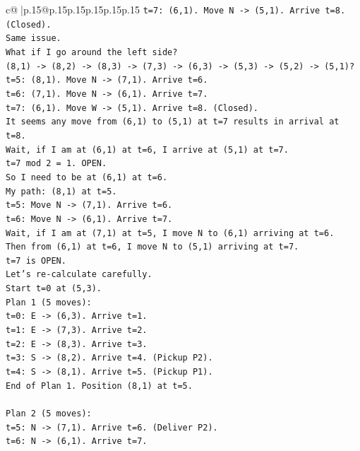 \documentclass{article}
\begin{document}
{\begin{supertabular}{c@{$\;$}|p{.15\linewidth}@{}p{.15\linewidth}p{.15\linewidth}p{.15\linewidth}p{.15\linewidth}p{.15\linewidth}}
{{{\texttt{t=7: (6,1). Move N {-}> (5,1). Arrive t=8. (Closed).} \\
\texttt{Same issue.} \\
\texttt{What if I go around the left side?} \\
\texttt{(8,1) {-}> (8,2) {-}> (8,3) {-}> (7,3) {-}> (6,3) {-}> (5,3) {-}> (5,2) {-}> (5,1)?} \\
\texttt{t=5: (8,1). Move N {-}> (7,1). Arrive t=6.} \\
\texttt{t=6: (7,1). Move N {-}> (6,1). Arrive t=7.} \\
\texttt{t=7: (6,1). Move W {-}> (5,1). Arrive t=8. (Closed).} \\
\texttt{It seems any move from (6,1) to (5,1) at t=7 results in arrival at t=8.} \\
\texttt{Wait, if I am at (6,1) at t=6, I arrive at (5,1) at t=7.} \\
\texttt{t=7 mod 2 = 1. OPEN.} \\
\texttt{So I need to be at (6,1) at t=6.} \\
\texttt{My path: (8,1) at t=5.} \\
\texttt{t=5: Move N {-}> (7,1). Arrive t=6.} \\
\texttt{t=6: Move N {-}> (6,1). Arrive t=7.} \\
\texttt{Wait, if I am at (7,1) at t=5, I move N to (6,1) arriving at t=6.} \\
\texttt{Then from (6,1) at t=6, I move N to (5,1) arriving at t=7.} \\
\texttt{t=7 is OPEN.} \\
\texttt{Let's re{-}calculate carefully.} \\
\texttt{Start t=0 at (5,3).} \\
\texttt{Plan 1 (5 moves):} \\
\texttt{t=0: E {-}> (6,3). Arrive t=1.} \\
\texttt{t=1: E {-}> (7,3). Arrive t=2.} \\
\texttt{t=2: E {-}> (8,3). Arrive t=3.} \\
\texttt{t=3: S {-}> (8,2). Arrive t=4. (Pickup P2).} \\
\texttt{t=4: S {-}> (8,1). Arrive t=5. (Pickup P1).} \\
\texttt{End of Plan 1. Position (8,1) at t=5.} \\
\\ 
\texttt{Plan 2 (5 moves):} \\
\texttt{t=5: N {-}> (7,1). Arrive t=6. (Deliver P2).} \\
\texttt{t=6: N {-}> (6,1). Arrive t=7.} \\
}}}
\end{supertabular}}
\end{document}
